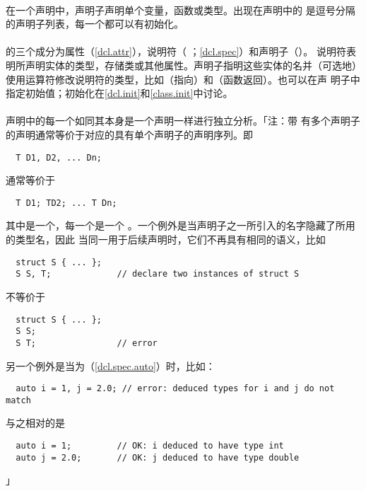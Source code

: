 
\paragraph{}
在一个声明中，声明子声明单个变量，函数或类型。出现在声明中的
是逗号分隔的声明子列表，每一个都可以有初始化。


\paragraph{}
的三个成分为属性（\ref{dcl.attr}），说明符（
；\ref{dcl.spec}）和声明子（）。
说明符表明所声明实体的类型，存储类或其他属性。声明子指明这些实体的名并（可选地）
使用运算符修改说明符的类型，比如\tm{*}（指向）和\tm{()}（函数返回）。也可以在声
明子中指定初始值；初始化在\ref{dcl.init}和\ref{class.init}中讨论。

\paragraph{}
声明中的每一个如同其本身是一个声明一样进行独立分析。「注：带
有多个声明子的声明通常等价于对应的具有单个声明子的声明序列。即
\begin{lstlisting}
  T D1, D2, ... Dn;
\end{lstlisting}
通常等价于
\begin{lstlisting}
  T D1; TD2; ... T Dn;
\end{lstlisting}
其中是一个，每一个是一个
。一个例外是当声明子之一所引入的名字隐藏了所用的类型名，因此
当同一用于后续声明时，它们不再具有相同的语义，比如
\begin{lstlisting}
  struct S { ... };
  S S, T;             // declare two instances of struct S
\end{lstlisting}
不等价于
\begin{lstlisting}
  struct S { ... };
  S S;
  S T;                // error
\end{lstlisting}
另一个例外是当为（\ref{dcl.spec.auto}）时，比如：
\begin{lstlisting}
  auto i = 1, j = 2.0; // error: deduced types for i and j do not match
\end{lstlisting}
与之相对的是
\begin{lstlisting}
  auto i = 1;         // OK: i deduced to have type int
  auto j = 2.0;       // OK: j deduced to have type double
\end{lstlisting}」

